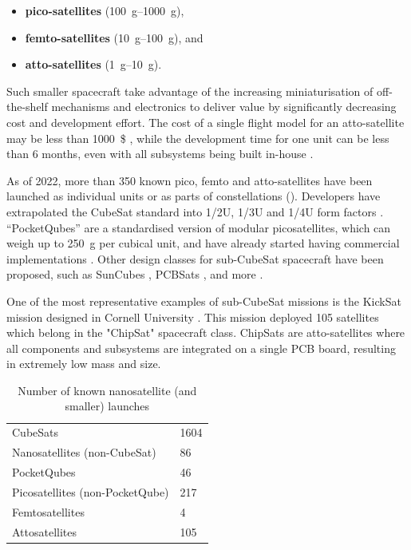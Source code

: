 \documentclass[]{iac}
\begin{document}
    \begin{itemize}[itemsep=0pt]
        \item \textbf{pico-satellites} (\SIrange{100}{1000}{\gram}),
        \item \textbf{femto-satellites} (\SIrange{10}{100}{\gram}), and
        \item \textbf{atto-satellites} (\SIrange{1}{10}{\gram}).
    \end{itemize}
    
    Such smaller spacecraft take advantage of the increasing miniaturisation of off-the-shelf mechanisms and electronics to deliver value by significantly decreasing cost and development effort. The cost of a single flight model for an atto-satellite may be less than \SI{1000}{\$} \autocite{manchester_kicksat_2013}, while the development time for one unit can be less than 6 months, even with all subsystems being built in-house \autocite{hein_attosats_2019}.

    As of 2022, more than 350 known pico, femto and atto-satellites have been launched as individual units or as parts of constellations (). Developers have extrapolated the CubeSat standard into 1/2U, 1/3U and 1/4U form factors \autocite{gangestad_flight_2015, kulu_nanosats_2021}. ``PocketQubes'' \autocite{PQ1} are a standardised version of modular picosatellites, which can weigh up to \SI{250}{\gram} per cubical unit, and have already started having commercial implementations \autocite{noauthor_unicorn_nodate,noauthor_fossa_2021}. Other design classes for sub-CubeSat spacecraft have been proposed, such as SunCubes \autocite{a_s_u_news_suncube_2016}, PCBSats \autocite{barnhart_enabling_2007,gong_design_2022}, and more \autocite{perez_survey_2016}.
    
    
    One of the most representative examples of sub-CubeSat missions is the KickSat mission designed in Cornell University \autocite{manchester_centimeter-scale_2015,manchester_kicksat_2013}. This mission deployed 105 satellites which belong in the "ChipSat" spacecraft class. ChipSats are atto-satellites where all components and subsystems are integrated on a single PCB board, resulting in extremely low mass and size.


    

    \begin{table}[bth]
    \caption{Number of known nanosatellite (and smaller) launches \autocite{kulu_nanosats_2021,abate_inexpensive_2019}}
    \label{tab:launch}
    \centering
    \begin{tabular}{@{}ll@{}}
    \toprule
    CubeSats                        & 1604 \\ %
    Nanosatellites (non-CubeSat)    & 86   \\[1ex]
    PocketQubes                     & 46   \\
    Picosatellites (non-PocketQube) & 217  \\[1ex]
    Femtosatellites                 & 4  \\
    Attosatellites                  & 105  \\ \bottomrule
    \end{tabular}
    \end{table}
\end{document}
